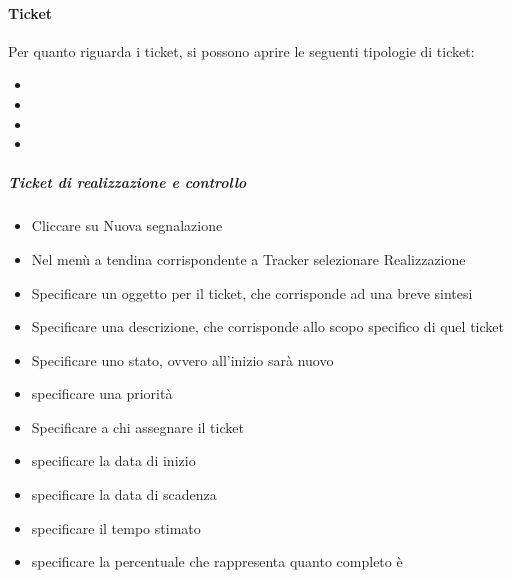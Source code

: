 \paragraph{Ticket \\}
Per quanto riguarda i ticket, si possono aprire le seguenti tipologie di ticket:
\begin{itemize}
\item {}
\item {}
\item {}
\item {}
\end{itemize}

\subparagraph{Ticket di realizzazione e controllo \\}
\begin{itemize}
\item Cliccare su Nuova segnalazione
\item Nel menù a tendina corrispondente a Tracker selezionare Realizzazione
\item Specificare un oggetto per il ticket, che corrisponde ad una breve sintesi
\item Specificare una descrizione, che corrisponde allo scopo specifico di quel ticket
\item Specificare uno stato, ovvero all'inizio sarà nuovo
\item specificare una priorità
\item Specificare a chi assegnare il ticket
\item specificare la data di inizio
\item specificare la data di scadenza
\item specificare il tempo stimato
\item specificare la percentuale che rappresenta quanto completo è
\end{itemize}

